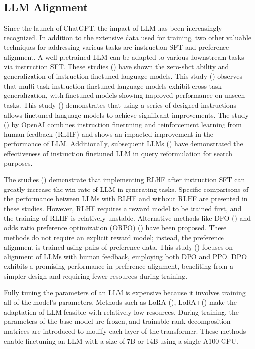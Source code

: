 \subsection{LLM Alignment}
Since the launch of ChatGPT, the impact of LLM has been increasingly recognized. In addition to the extensive data used for training, two other valuable techniques for addressing various tasks are instruction SFT and preference alignment. A well pretrained LLM can be adapted to various downstream tasks via instruction SFT. These studies (\cite{wei2022finetunedlanguagemodelszeroshot,mishra2022crosstaskgeneralizationnaturallanguage}) have shown the zero-shot ability and generalization of instruction finetuned language models. This study (\cite{mishra2022crosstaskgeneralizationnaturallanguage}) observes that multi-task instruction finetuned language models exhibit cross-task generalization, with finetuned models showing improved performance on unseen tasks. This study (\cite{chung2022scalinginstructionfinetunedlanguagemodels}) demonstrates that using a series of designed instructions allows finetuned language models to achieve significant improvements. The study (\cite{ouyang2022traininglanguagemodelsfollow}) by OpenAI combines instruction finetuning and reinforcement learning from human feedback (RLHF) and shows an impacted improvement in the performance of LLM. Additionally, subsequent LLMs (\cite{bai2023qwentechnicalreport,touvron2023llama2openfoundation,peng2024largelanguagemodelbased}) have demonstrated the effectiveness of instruction finetuned LLM in query reformulation for search purposes.

The studies (\cite{ouyang2022traininglanguagemodelsfollow,touvron2023llama2openfoundation}) demonstrate that implementing RLHF after instruction SFT can greatly increase the win rate of LLM in generating tasks. Specific comparisons of the performance between LLMs with RLHF and without RLHF are presented in these studies. However, RLHF requires a reward model to be trained first, and the training of RLHF is relatively unstable. Alternative methods like DPO (\cite{rafailov2023directpreferenceoptimizationlanguage}) and odds ratio preference optimization (ORPO) (\cite{hong2024orpomonolithicpreferenceoptimization}) have been proposed. These methods do not require an explicit reward model; instead, the preference alignment is trained using pairs of preference data. This study (\cite{hou2024chatglmrlhfpracticesaligninglarge}) focuses on alignment of LLMs with human feedback, employing both DPO and PPO. DPO exhibits a promising performance in preference alignment, benefiting from a simpler design and requiring fewer resources during training.

Fully tuning the parameters of an LLM is expensive because it involves training all of the model's parameters. Methods such as LoRA (\cite{hu2021loralowrankadaptationlarge}), LoRA+(\cite{hayou2024loraefficientlowrank}) make the adaptation of LLM feasible with relatively low resources. During training, the parameters of the base model are frozen,  and trainable rank decomposition matrices are introduced to modify each layer of the transformer. These methods enable finetuning an LLM with a size of 7B or 14B using a single A100 GPU.